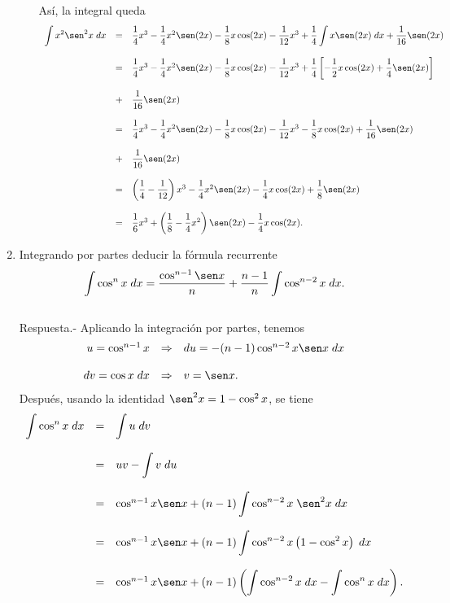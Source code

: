 \begin{enumerate}[\bfseries 1.]
\begin{enumerate}[(a)]
$$		$$
		Así, la integral queda
		$$
		\begin{array}{rcl}
		    \displaystyle\int x^2\sen^2x\; dx &=& \dfrac{1}{4}x^3-\dfrac{1}{4}x^2 \sen(2x)-\dfrac{1}{8}x\cos(2x)-\dfrac{1}{12}x^3+\dfrac{1}{4}\displaystyle\int x\sen(2x)\; dx +\dfrac{1}{16}\sen(2x)\\\\
		    &=& \dfrac{1}{4}x^3-\dfrac{1}{4}x^2 \sen(2x)-\dfrac{1}{8}x\cos(2x)-\dfrac{1}{12}x^3+\dfrac{1}{4}\left[-\dfrac{1}{2}x\cos(2x)+\dfrac{1}{4}\sen(2x)\right]\\\\
		    &+&\dfrac{1}{16}\sen(2x)\\\\
		    &=& \dfrac{1}{4}x^3-\dfrac{1}{4}x^2\sen(2x)-\dfrac{1}{8}x\cos(2x)-\dfrac{1}{12}x^3-\dfrac{1}{8}x\cos(2x)+\dfrac{1}{16}\sen(2x)\\\\
		    &+&\dfrac{1}{16}\sen(2x)\\\\
		    &=&\left(\dfrac{1}{4}-\dfrac{1}{12}\right)x^3 - \dfrac{1}{4}x^2\sen(2x)-\dfrac{1}{4}x\cos(2x)+\dfrac{1}{8}\sen(2x)\\\\
		    &=&\dfrac{1}{6}x^3+\left(\dfrac{1}{8}-\dfrac{1}{4}x^2\right)\sen(2x)-\dfrac{1}{4}x\cos(2x).
		\end{array}
		$$
		\vspace{.5cm}

	\end{enumerate}

    \item Integrando por partes deducir la fórmula recurrente
    $$\int \cos^n x\; dx = \dfrac{\cos^{n-1}\sen x}{n}+\dfrac{n-1}{n}\int \cos^{n-2}x\; dx.$$\\
	Respuesta.-\; Aplicando la integración por partes, tenemos
	$$
	\begin{array}{rcl}
	    u=\cos^{n-1} x&\Rightarrow&du=-(n-1)\cos^{n-2} x \sen x\; dx\\\\
	    dv=\cos x\; dx &\Rightarrow&v=\sen x.
	\end{array}
	$$
	Después, usando la identidad $\sen^2 x = 1-\cos^2 x$, se tiene
	$$
	\begin{array}{rcl}
	    \displaystyle\int \cos^n x\; dx&=& \displaystyle\int u\; dv\\\\
					   &=& uv-\displaystyle \int v\; du\\\\
					   &=& \cos^{n-1}x\sen x + (n-1)\displaystyle\int \cos^{n-2}x\; \sen^2x\; dx\\\\
					   &=& \cos^{n-1}x\sen x + (n-1)\displaystyle\int \cos^{n-2}x\left(1-\cos^2 x\right)\; dx\\\\
					   &=& \cos^{n-1}x\sen x + (n-1)\left(\displaystyle\int \cos^{n-2}x\; dx - \int\cos^n x\; dx \right).
	\end{array}
	$$


\end{enumerate}
